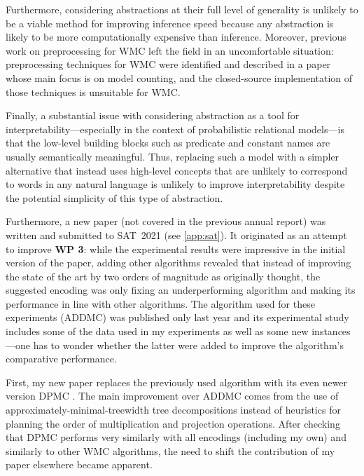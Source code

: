 \documentclass{article}
\begin{document}
\begin{description}
  Furthermore, considering abstractions at their full level of generality is
  unlikely to be a viable method for improving inference speed because any
  abstraction is likely to be more computationally expensive than inference.
  Moreover, previous work on preprocessing for WMC left the field in an
  uncomfortable situation: preprocessing techniques for WMC were identified and
  described in a paper \cite{DBLP:conf/aaai/LagniezM14} whose main focus is on
  model counting, and the closed-source implementation of those techniques is
  unsuitable for WMC.

  Finally, a substantial issue with considering abstraction as a tool for
  interpretability---especially in the context of probabilistic relational
  models---is that the low-level building blocks such as predicate and constant
  names are usually semantically meaningful. Thus, replacing such a model with a
  simpler alternative that instead uses high-level concepts that are unlikely to
  correspond to words in any natural language is unlikely to improve
  interpretability despite the potential simplicity of this type of abstraction.
\item Furthermore, a new paper (not covered in the previous annual report) was
  written and submitted to SAT~2021 (see \cref{app:sat}). It originated as an
  attempt to improve \textbf{WP 3}: while the experimental results were
  impressive in the initial version of the paper, adding other algorithms
  revealed that instead of improving the state of the art by two orders of
  magnitude as originally thought, the suggested encoding was only fixing an
  underperforming algorithm and making its performance in line with other
  algorithms. The algorithm used for these experiments (ADDMC) was published
  only last year \cite{DBLP:conf/aaai/DudekPV20} and its experimental study
  includes some of the data used in my experiments as well as some new
  instances---one has to wonder whether the latter were added to improve the
  algorithm's comparative performance.

  First, my new paper replaces the previously used algorithm with its even newer
  version DPMC \cite{DBLP:conf/cp/DudekPV20}. The main improvement over ADDMC
  comes from the use of approximately-minimal-treewidth tree decompositions
  instead of heuristics for planning the order of multiplication and projection
  operations. After checking that DPMC performs very similarly with all
  encodings (including my own) and similarly to other WMC algorithms, the need
  to shift the contribution of my paper elsewhere became apparent.


\end{description}
\end{document}
